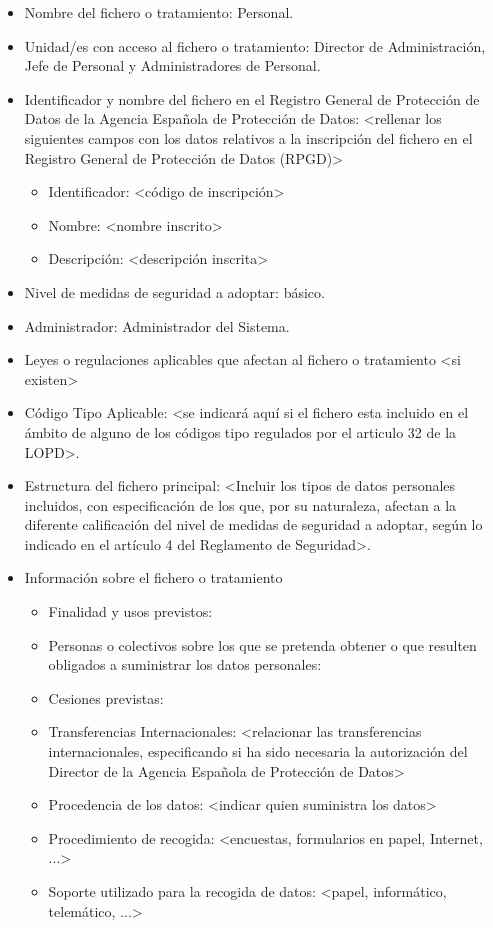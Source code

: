 \documentclass[a4paper,11pt,bibtotoc,noliststotoc]{scrbook}
\begin{document}
\begin{itemize}
\item Nombre del fichero o tratamiento: Personal.

\item Unidad/es con acceso al fichero o tratamiento: Director de Administración, Jefe de Personal y Administradores de Personal.

\item Identificador y nombre del fichero en el Registro General de Protección de Datos de la Agencia Española de Protección de Datos: <rellenar los siguientes campos con los datos relativos a la inscripción del fichero en el Registro General de Protección de Datos (RPGD)>
	\begin{itemize}
	\item Identificador: <código de inscripción>
	\item Nombre: <nombre inscrito>
	\item Descripción: <descripción inscrita>
	\end{itemize}

\item Nivel de medidas de seguridad a adoptar: básico.

\item Administrador: Administrador del Sistema.

\item Leyes o regulaciones aplicables que afectan al fichero o tratamiento <si existen>

\item Código Tipo Aplicable: <se indicará aquí si el fichero esta incluido en el ámbito de alguno de los códigos tipo regulados por el articulo 32 de la LOPD>.

\item Estructura del fichero principal: <Incluir los tipos de datos personales incluidos, con especificación de los que, por su naturaleza, afectan a la diferente calificación del nivel de medidas de seguridad a adoptar, según lo indicado en el artículo 4 del Reglamento de Seguridad>.

\item Información sobre el fichero o tratamiento
	\begin{itemize}
	\item Finalidad y usos previstos:
	\item Personas o colectivos sobre los que se pretenda obtener o que resulten obligados a suministrar los datos personales:
	\item Cesiones previstas:
	\item Transferencias Internacionales: <relacionar las transferencias internacionales, especificando si ha sido necesaria la autorización del Director de la Agencia Española de Protección de Datos>
	\item Procedencia de los datos: <indicar quien suministra los datos>
	\item Procedimiento de recogida: <encuestas, formularios en papel, Internet, ...>
	\item Soporte utilizado para la recogida de datos: <papel, informático, telemático, ...>
	\end{itemize}


\end{itemize}
\end{document}

